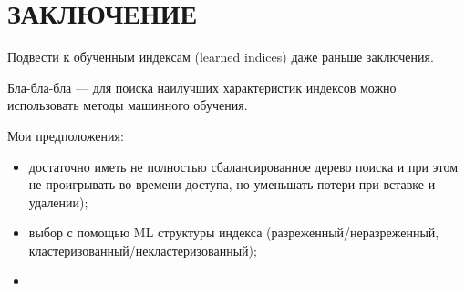 \chapter*{ЗАКЛЮЧЕНИЕ}

Подвести к обученным индексам (learned indices) даже раньше заключения.

Бла-бла-бла --- для поиска наилучших характеристик индексов можно использовать
методы машинного обучения.

Мои предположения:

\begin{itemize}
    \item достаточно иметь не полностью сбалансированное дерево поиска и при
        этом не проигрывать во времени доступа, но уменьшать потери при вставке
        и удалении);
    \item выбор с помощью ML структуры индекса (разреженный/неразреженный,
        кластеризованный/некластеризованный);
    \item
\end{itemize}

